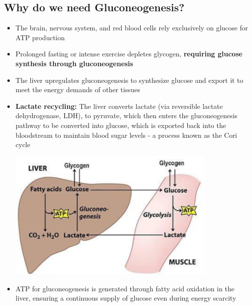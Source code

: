 \documentclass[10pt]{article}
\begin{document}
\subsection*{Why do we need Gluconeogenesis?}
\begin{itemize}
	\item The brain, nervous system, and red blood cells rely exclusively on glucose for ATP production
	\item Prolonged fasting or intense exercise depletes glycogen, \textbf{requiring glucose synthesis through gluconeogenesis}
	\item The liver upregulates gluconeogenesis to synthesize glucose and export it to meet the energy demands of other tissues
	\item \textbf{Lactate recycling:}  The liver converts lactate (via reversible lactate dehydrogenase, LDH), to pyruvate, which then enters the gluconeogenesis pathway to be converted into glucose, which is exported back into the bloodstream to maintain blood sugar levels - a process known as the Cori cycle
	\begin{center} 
        \includegraphics*[width=0.8\textwidth]{L2_12.png}
    \end{center}
    \item ATP for gluconeogenesis is generated through fatty acid oxidation in the liver, ensuring a continuous supply of glucose even during energy scarcity
\end{itemize}
\end{document}
